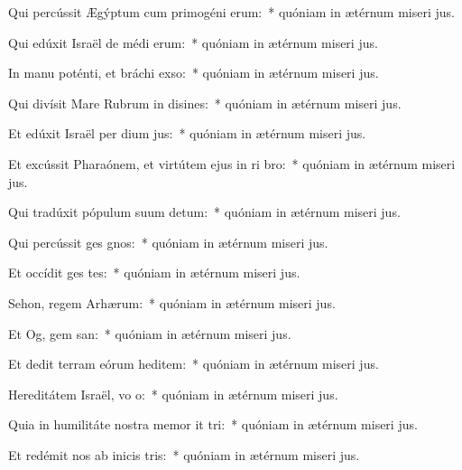 \item Qui percússit Ægýptum cum primogéni erum:~* quóniam in ætérnum miseri jus.
\item Qui edúxit Israël de médi erum:~* quóniam in ætérnum miseri jus.
\item In manu poténti, et bráchi exso:~* quóniam in ætérnum miseri jus.
\item Qui divísit Mare Rubrum in disines:~* quóniam in ætérnum miseri jus.
\item Et edúxit Israël per dium jus:~* quóniam in ætérnum miseri jus.
\item Et excússit Pharaónem, et virtútem ejus in ri bro:~* quóniam in ætérnum miseri jus.
\item Qui tradúxit pópulum suum  detum:~* quóniam in ætérnum miseri jus.
\item Qui percússit ges gnos:~* quóniam in ætérnum miseri jus.
\item Et occídit ges tes:~* quóniam in ætérnum miseri jus.
\item Sehon, regem Arhærum:~* quóniam in ætérnum miseri jus.
\item Et Og, gem san:~* quóniam in ætérnum miseri jus.
\item Et dedit terram eórum heditem:~* quóniam in ætérnum miseri jus.
\item Hereditátem Israël, vo o:~* quóniam in ætérnum miseri jus.
\item Quia in humilitáte nostra memor it tri:~* quóniam in ætérnum miseri jus.
\item Et redémit nos ab inicis tris:~* quóniam in ætérnum miseri jus.
